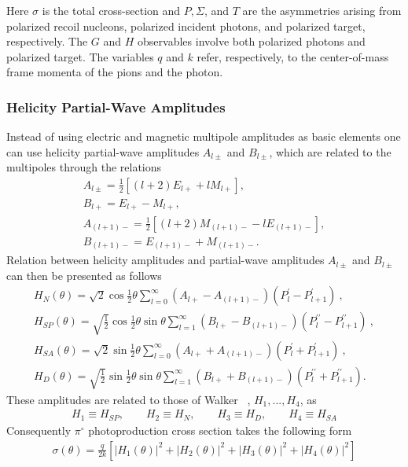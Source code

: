 Here $\sigma$ is the total cross-section and $P,\Sigma$, and $T$ are the asymmetries arising from polarized recoil nucleons, polarized incident photons, and polarized target, respectively. The $G$ and $H$ observables involve both polarized photons and polarized target. The variables $q$ and $k$ refer, respectively, to the center-of-mass frame momenta of the pions and the photon.
%
\subsubsection{Helicity Partial-Wave Amplitudes}\label{sec:into:helicity}
%
Instead of using electric and magnetic multipole amplitudes as basic elements one can use helicity partial-wave amplitudes $A_{l\pm}$ and $B_{l\pm}$, which are related to the multipoles through the relations
%
\begin{align}
A_{l\pm} = \frac{1}{2}[(l+2)E_{l+} + lM_{l+}],\nonumber\\
B_{l+} = E_{l+} - M_{l+},\nonumber\\
A_{(l+1)-} =  \frac{1}{2}[(l+2)M_{(l+1)-}-lE_{(l+1)-}],\nonumber\\
B_{(l+1)-} = E_{(l+1)-} + M_{(l+1)-}.
\end{align}
%
Relation between helicity amplitudes and partial-wave amplitudes $A_{l\pm}$ and $B_{l\pm}$ can then be presented as follows
%
\begin{align}
H_{N}(\theta) = \sqrt{2}\cos\frac{1}{2}\theta \displaystyle\sum_{l=0}^{\infty} {(A_{l+} - A_{(l+1)-} )( P^{\prime}_{l}-P^{\prime}_{l+1})} \ ,\nonumber\\
%
H_{SP}(\theta) = \sqrt{\frac{1}{2}}\cos\frac{1}{2}\theta \sin \theta \displaystyle\sum_{l=1}^{\infty} {( B_{l+} - B_{(l+1)-} )( P^{\prime \prime}_{l}-P^{\prime \prime}_{l+1})} \ ,\nonumber \\
%
H_{SA}(\theta) = \sqrt{2}\sin\frac{1}{2}\theta \displaystyle\sum_{l=0}^{\infty} { (A_{l+}  + A_{(l+1)-})( P^{\prime}_{l}+P^{\prime}_{l+1})} \ ,\nonumber\\
%
H_{D}(\theta) = \sqrt{\frac{1}{2}}\sin\frac{1}{2}\theta \sin \theta \sum_{l=1}^{\infty} {( B_{l+} + B_{(l+1)-})( P^{\prime \prime}_{l}+P^{\prime \prime}_{l+1})}.
\end{align}
%
These amplitudes are related to those of Walker ~\protect\cite{Walker}, $H_1,...,H_4$, as
%
\begin{align}
H_1\equiv H_{SP}, \qquad H_2\equiv H_{N}, \qquad H_3\equiv H_D, \qquad H_4\equiv H_{SA}
\end{align}
%
Consequently $\pi^{\circ}$ photoproduction  cross section takes the following form
%
\begin{align}
	\sigma(\theta) = \frac{q}{2k}[|H_{1}(\theta)|^2 + |H_{2}(\theta)|^2 + |H_{3}(\theta)|^2 + |H_{4}(\theta)|^2]
\end{align}
%
